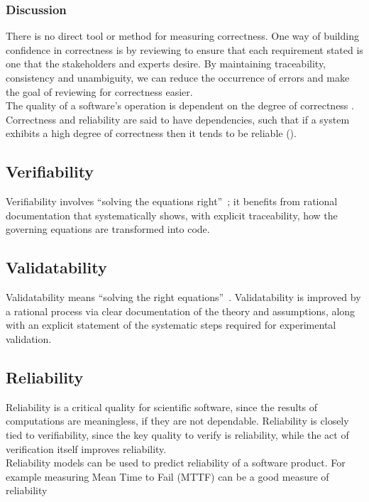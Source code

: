 \documentclass[letterpaper,cleveref]{lipics-v2019}
\theoremstyle{definition}
\begin{document}
\subsubsection{Discussion}
There is no direct tool or
method for measuring correctness. One way of building confidence in correctness
is by reviewing to ensure that each requirement stated is one that the
stakeholders and experts desire.  By maintaining traceability, consistency and
unambiguity, we can reduce the occurrence of errors and make the goal of
reviewing for correctness easier.\\
 The quality of a software's operation is dependent on the degree of correctness \cite{berander2005software}. Correctness and reliability are said to have dependencies, such that if a system exhibits a high degree of correctness then it tends to be reliable (\cite{GhezziEtAl2003}).

\subsection{Verifiability}

Verifiability involves ``solving the equations right''~\cite[p.~23]{Roache1998};
it benefits from rational documentation that systematically shows, with explicit
traceability, how the governing equations are transformed into code.

\subsection{Validatability}

Validatability means ``solving the right equations''~\cite[p.~23]{Roache1998}.
Validatability is improved by a rational process via clear documentation of the
theory and assumptions, along with an explicit statement of the systematic steps
required for experimental validation.

\subsection{Reliability}

Reliability is a critical quality for scientific software, since the results of
computations are meaningless, if they are not dependable.  Reliability is
closely tied to verifiability, since the key quality to verify is reliability,
while the act of verification itself improves reliability.\\
Reliability models can be used to predict reliability of a software product. For example measuring Mean Time to Fail (MTTF) can be a good measure of reliability \cite{berander2005software}
\end{document}
